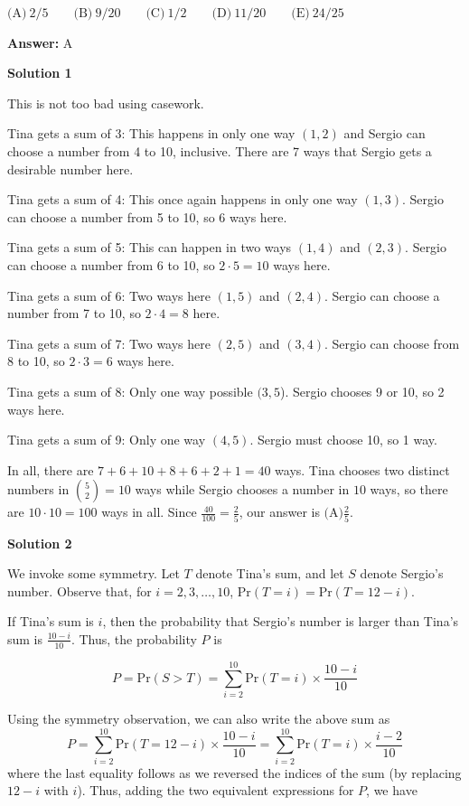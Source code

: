 \begin{enumerate}
 $\text{(A)}\ 2/5 \qquad \text{(B)}\ 9/20 \qquad \text{(C)}\ 1/2 \qquad \text{(D)}\ 11/20 \qquad \text{(E)}\ 24/25$

 \textbf{Answer: }A



\textbf{Solution 1}

This is not too bad using casework. 

 Tina gets a sum of 3: This happens in only one way $(1,2)$ and Sergio can choose a number from 4 to 10, inclusive. There are 7 ways that Sergio gets a desirable number here.

 Tina gets a sum of 4: This once again happens in only one way $(1,3)$. Sergio can choose a number from 5 to 10, so 6 ways here.

 Tina gets a sum of 5: This can happen in two ways $(1,4)$ and $(2,3)$. Sergio can choose a number from 6 to 10, so $2\cdot5=10$ ways here.

 Tina gets a sum of 6: Two ways here $(1,5)$ and $(2,4)$. Sergio can choose a number from 7 to 10, so $2\cdot4=8$ here.

 Tina gets a sum of 7: Two ways here $(2,5)$ and $(3,4)$. Sergio can choose from 8 to 10, so $2\cdot3=6$ ways here.

 Tina gets a sum of 8: Only one way possible $(3,5$). Sergio chooses 9 or 10, so 2 ways here.

 Tina gets a sum of 9: Only one way $(4,5)$. Sergio must choose 10, so 1 way.

 In all, there are $7+6+10+8+6+2+1=40$ ways. Tina chooses two distinct numbers in $\binom{5}{2}=10$ ways while Sergio chooses a number in $10$ ways, so there are $10\cdot 10=100$ ways in all. Since $\frac{40}{100}=\frac{2}{5}$, our answer is $\boxed{\text{(A)}\frac{2}{5}}$.

 



\textbf{Solution 2}

We invoke some symmetry. Let $T$ denote Tina's sum, and let $S$ denote Sergio's number. Observe that, for $i = 2, 3, \ldots, 10$, $\text{Pr}(T=i) = \text{Pr}(T=12-i)$.

 If Tina's sum is $i$, then the probability that Sergio's number is larger than Tina's sum is $\frac{10-i}{10}$. Thus, the probability $P$ is

 
 \[P = \text{Pr}(S>T) = \sum_{i=2}^{10} \text{Pr}(T=i) \times \frac{10-i}{10}\]

 Using the symmetry observation, we can also write the above sum as
 \[P = \sum_{i=2}^{10} \text{Pr}(T=12-i) \times \frac{10-i}{10} = \sum_{i=2}^{10} \text{Pr}(T=i) \times \frac{i-2}{10}\]where the last equality follows as we reversed the indices of the sum (by replacing $12-i$ with $i$). Thus, adding the two equivalent expressions for $P$, we have


\end{enumerate}
